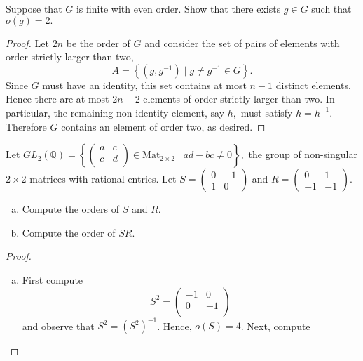 \documentclass[10pt]{amsart}
\begin{document}
\begin{thm}
	Suppose that $G$ is finite with even order.  Show that there exists $g \in G$ such that $o(g) = 2.$
	\begin{proof}
	Let $2n$ be the order of $G$ and consider the set of pairs of elements with order strictly larger than two, 
		$$A = \left\{ (g,g^{-1}) \mid g \not = g^{-1} \in G \right\}.$$
	Since $G$ must have an identity, this set contains at most $n - 1$ distinct elements. 
	Hence there are at most $2n-2$ elements of order strictly larger than two.
	In particular, the remaining non-identity element, say $h,$ must satisfy $h = h^{-1}$.
	Therefore $G$ contains an element of order two, as desired.
	\end{proof}
\end{thm}

\begin{thm}
  Let $\displaystyle{GL_2(\mathbb{Q}) = \left\{ \left(
  \begin{array}{cc}
    a & c\\
    c & d\\
    \end{array}
  \right) \in \text{Mat}_{2\times 2}\mid ad - bc \not = 0\right\}},$ the group of non-singular $2 \times 2$ matrices with rational entries.  Let $S = \displaystyle{\left(
    \begin{array}{cc}
      0 & -1\\
      1 & 0
    \end{array}
    \right)}$ and $R = \displaystyle{\left(    
    \begin{array}{cc}
      0 & 1\\
      -1 & -1
    \end{array}\right)}$.
  \begin{enumerate}[(a)]
    \item
      Compute the orders of $S$ and $R$.
    \item 
      Compute the order of $SR$.
  \end{enumerate}
  \begin{proof}
    \begin{enumerate}[(a)]
    \item
      First compute 
      $$S^2 = \left(\begin{array}{cc}
        -1 & 0\\
        0 & -1\\
        \end{array}\right)$$
      and observe that $S^2 = (S^2)^{-1}$.  Hence, $o(S) = 4$.
      Next, compute

\end{enumerate}
\end{proof}
\end{thm}
\end{document}
